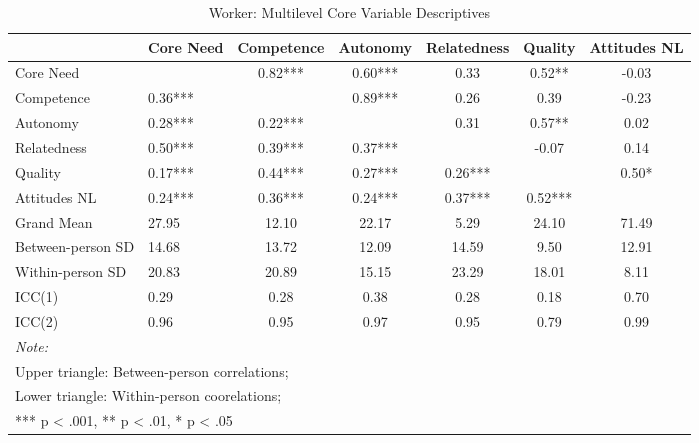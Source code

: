 \begin{table}
\begin{minipage}[t][\textheight][t]{\textwidth}

\caption{\label{tab:workerVarDescr}Worker: Multilevel Core Variable Descriptives}
\centering
\begin{tabular}[t]{llccccc}
\toprule
  & Core Need & Competence & Autonomy & Relatedness & Quality & Attitudes NL\\
\midrule
Core Need &  & 0.82*** & 0.60*** & 0.33 & 0.52** & -0.03\\
Competence & 0.36*** &  & 0.89*** & 0.26 & 0.39 & -0.23\\
Autonomy & 0.28*** & 0.22*** &  & 0.31 & 0.57** & 0.02\\
Relatedness & 0.50*** & 0.39*** & 0.37*** &  & -0.07 & 0.14\\
Quality & 0.17*** & 0.44*** & 0.27*** & 0.26*** &  & 0.50*\\
Attitudes NL & 0.24*** & 0.36*** & 0.24*** & 0.37*** & 0.52*** & \\
\addlinespace
Grand Mean & 27.95 & 12.10 & 22.17 & 5.29 & 24.10 & 71.49\\
Between-person SD & 14.68 & 13.72 & 12.09 & 14.59 & 9.50 & 12.91\\
Within-person SD & 20.83 & 20.89 & 15.15 & 23.29 & 18.01 & 8.11\\
ICC(1) & 0.29 & 0.28 & 0.38 & 0.28 & 0.18 & 0.70\\
ICC(2) & 0.96 & 0.95 & 0.97 & 0.95 & 0.79 & 0.99\\
\bottomrule
\multicolumn{7}{l}{\rule{0pt}{1em}\textit{Note: }}\\
\multicolumn{7}{l}{\rule{0pt}{1em}Upper triangle: Between-person correlations;}\\
\multicolumn{7}{l}{\rule{0pt}{1em}Lower triangle: Within-person coorelations;}\\
\multicolumn{7}{l}{\rule{0pt}{1em}*** p < .001, ** p < .01,  * p < .05}\\
\end{tabular}
\end{minipage}
\end{table}

